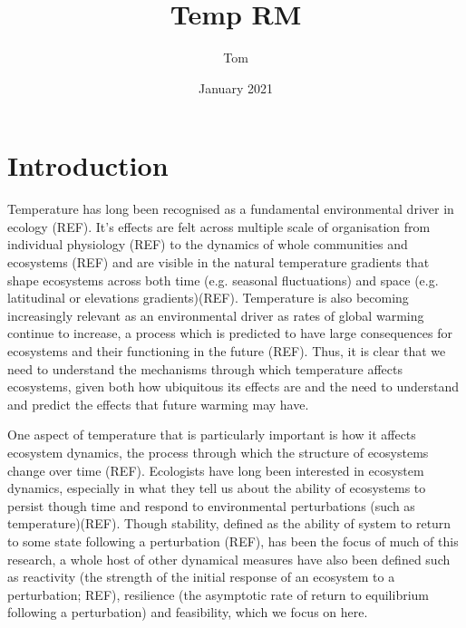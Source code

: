 \documentclass{article}
\title{Temp RM}
\author{Tom}
\date{January 2021}
\begin{document}
\maketitle

\section{Introduction}

Temperature has long been recognised as a fundamental environmental driver in ecology (REF). It's effects are felt across multiple scale of organisation from individual physiology (REF) to the dynamics of whole communities and ecosystems (REF) and are visible in the natural temperature gradients that shape ecosystems across both time (e.g. seasonal fluctuations) and space (e.g. latitudinal or elevations gradients)(REF). Temperature is also becoming increasingly relevant as an environmental driver as rates of global warming continue to increase, a process which is predicted to have large consequences for ecosystems and their functioning in the future (REF). Thus, it is clear that we need to understand the mechanisms through which temperature affects ecosystems, given both how ubiquitous its effects are and the need to understand and predict the effects that future warming may have. 

One aspect of temperature that is particularly important is how it affects ecosystem dynamics, the process through which the structure of ecosystems change over time (REF). Ecologists have long been interested in ecosystem dynamics, especially in what they tell us about the ability of ecosystems to persist though time and respond to environmental perturbations (such as temperature)(REF). Though stability, defined as the ability of system to return to some state following a perturbation (REF), has been the focus of much of this research, a whole host of other dynamical measures have also been defined such as reactivity (the strength of the initial response of an ecosystem to a perturbation; REF), resilience (the asymptotic rate of return to equilibrium following a perturbation) and feasibility, which we focus on here. 
\end{document}
